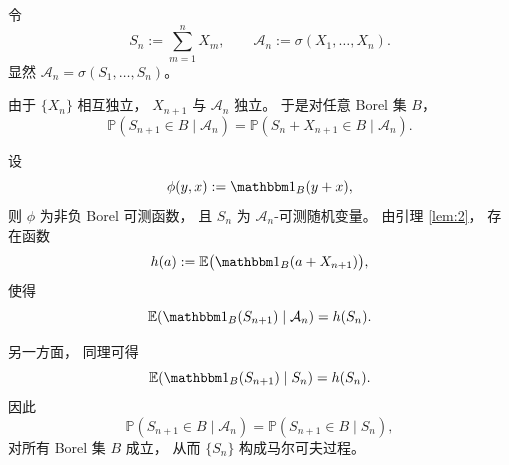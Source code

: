 \documentclass{ctexart}
\begin{document}
\begin{solution}
  令
  \[
    S_n:=\sum_{m=1}^n X_m,\qquad
    \mathcal A_n:=\sigma(X_1,\dots,X_n).
  \]
  显然 $\mathcal A_n=\sigma(S_1,\dots,S_n)$。

  由于 $\{X_n\}$ 相互独立，
  $X_{n+1}$ 与 $\mathcal A_n$ 独立。
  于是对任意 Borel 集 $B$，
  \[
    \mathbb P(S_{n+1}\in B\mid\mathcal A_n)
    =
    \mathbb P(S_n+X_{n+1}\in B\mid\mathcal A_n).
  \]

  设
  \[
    \phi(y,x):=\mathbbm 1_B(y+x),
  \]
  则 $\phi$ 为非负 Borel 可测函数，
  且 $S_n$ 为 $\mathcal A_n$-可测随机变量。
  由引理 \ref{lem:2}，
  存在函数
  \[
    h(a):=\mathbb E\bigl(\mathbbm 1_B(a+X_{n+1})\bigr),
  \]
  使得
  \[
    \mathbb E(\mathbbm 1_B(S_{n+1})\mid\mathcal A_n)
    =
    h(S_n).
  \]

  另一方面，
  同理可得
  \[
    \mathbb E(\mathbbm 1_B(S_{n+1})\mid S_n)=h(S_n).
  \]
  因此
  \[
    \mathbb P(S_{n+1}\in B\mid\mathcal A_n)
    =
    \mathbb P(S_{n+1}\in B\mid S_n),
  \]
  对所有 Borel 集 $B$ 成立，
  从而 $\{S_n\}$ 构成马尔可夫过程。
\end{solution}
\end{document}
